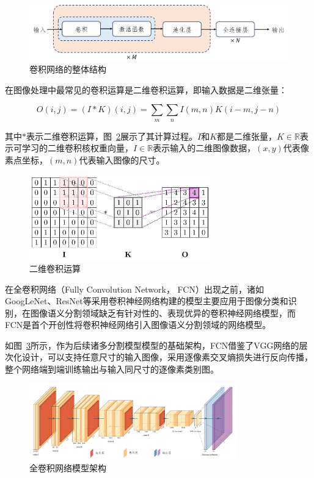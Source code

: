 \begin{figure}[htbp]
    \centering
    \includegraphics[width=\textwidth]{fig/cnn_frame.png}
    \caption{卷积网络的整体结构}
    \label{fig:cnn}
\end{figure}

在图像处理中最常见的卷积运算是二维卷积运算，即输入数据是二维张量：

\begin{equation}
    O(i, j)=(I * K)(i, j)=\sum_{m} \sum_{n} I(m, n) K(i-m, j-n)
\end{equation}

其中$*$表示二维卷积运算，图~\ref{fig:2dcnn}展示了其计算过程。$I$和$K$都是二维张量，$ K \in \mathbb{R}$表示可学习的二维卷积核权重向量，$I \in \mathbb{R}$表示输入的二维图像数据，$(x, y)$代表像素点坐标，$(m, n)$代表输入图像的尺寸。

\begin{figure}[!htbp]
    \centering
    \includegraphics[width=0.7\textwidth]{fig/2dcnn-1.png}
    \caption{二维卷积运算}
    \label{fig:2dcnn}
\end{figure}

在全卷积网络（Fully Convolution Network， FCN）出现之前，诸如GoogLeNet、ResNet等采用卷积神经网络构建的模型主要应用于图像分类和识别，在图像语义分割领域缺乏有针对性的、表现优异的卷积神经网络模型，而FCN是首个开创性将卷积神经网络引入图像语义分割领域的网络模型\cite{shelhamer2016}。

如图~\ref{fig:fcn_frame}所示，作为后续诸多分割模型模型的基础架构，FCN借鉴了VGG网络的层次化设计，可以支持任意尺寸的输入图像，采用逐像素交叉熵损失进行反向传播，整个网络端到端训练输出与输入同尺寸的逐像素类别图。

\begin{figure}[!htbp]
    \centering
    \includegraphics[width=0.8\textwidth]{fig/fcn_frame.png}
    \caption{全卷积网络模型架构}
    \label{fig:fcn_frame}
\end{figure}

